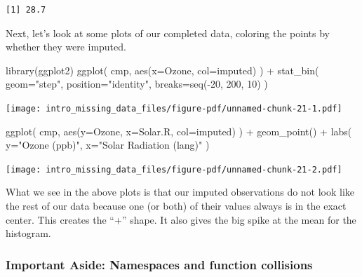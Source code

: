 \documentclass[
  letterpaper,
  DIV=11,
  numbers=noendperiod]{scrreprt}
\newenvironment{Shaded}{}{}
\newcommand{\AttributeTok}[1]{\textcolor[rgb]{0.49,0.56,0.16}{#1}}
\newcommand{\DecValTok}[1]{\textcolor[rgb]{0.25,0.63,0.44}{#1}}
\newcommand{\FunctionTok}[1]{\textcolor[rgb]{0.02,0.16,0.49}{#1}}
\newcommand{\NormalTok}[1]{#1}
\newcommand{\SpecialCharTok}[1]{\textcolor[rgb]{0.25,0.44,0.63}{#1}}
\newcommand{\StringTok}[1]{\textcolor[rgb]{0.25,0.44,0.63}{#1}}
\begin{document}
\begin{verbatim}
[1] 28.7
\end{verbatim}

Next, let's look at some plots of our completed data, coloring the
points by whether they were imputed.

\begin{Shaded}
\begin{Highlighting}[]
\FunctionTok{library}\NormalTok{(ggplot2)}
\FunctionTok{ggplot}\NormalTok{( cmp, }\FunctionTok{aes}\NormalTok{(}\AttributeTok{x=}\NormalTok{Ozone, }\AttributeTok{col=}\NormalTok{imputed) ) }\SpecialCharTok{+}
    \FunctionTok{stat\_bin}\NormalTok{( }\AttributeTok{geom=}\StringTok{"step"}\NormalTok{, }\AttributeTok{position=}\StringTok{"identity"}\NormalTok{,}
              \AttributeTok{breaks=}\FunctionTok{seq}\NormalTok{(}\SpecialCharTok{{-}}\DecValTok{20}\NormalTok{, }\DecValTok{200}\NormalTok{, }\DecValTok{10}\NormalTok{) )}
\end{Highlighting}
\end{Shaded}

\begin{center}
\texttt{[image: intro\_missing\_data\_files/figure-pdf/unnamed-chunk-21-1.pdf]}
\end{center}

\begin{Shaded}
\begin{Highlighting}[]
\FunctionTok{ggplot}\NormalTok{( cmp, }\FunctionTok{aes}\NormalTok{(}\AttributeTok{y=}\NormalTok{Ozone, }\AttributeTok{x=}\NormalTok{Solar.R, }\AttributeTok{col=}\NormalTok{imputed) ) }\SpecialCharTok{+}
    \FunctionTok{geom\_point}\NormalTok{() }\SpecialCharTok{+}
    \FunctionTok{labs}\NormalTok{( }\AttributeTok{y=}\StringTok{"Ozone (ppb)"}\NormalTok{, }\AttributeTok{x=}\StringTok{"Solar Radiation (lang)"}\NormalTok{ )}
\end{Highlighting}
\end{Shaded}

\begin{center}
\texttt{[image: intro\_missing\_data\_files/figure-pdf/unnamed-chunk-21-2.pdf]}
\end{center}

What we see in the above plots is that our imputed observations do not
look like the rest of our data because one (or both) of their values
always is in the exact center. This creates the ``+'' shape. It also
gives the big spike at the mean for the histogram.

\subsubsection{Important Aside: Namespaces and function
collisions}\label{important-aside-namespaces-and-function-collisions}
\end{document}
